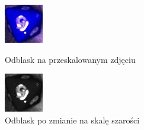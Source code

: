 \begin{figure}[H]
    \centering
    \begin{minipage}[t]{0.45\linewidth}
        \centering
        \includegraphics[width=\linewidth]{chapters/04-czytanie/figures/blask_raw}
        \caption{Odblask na przeskalowanym zdjęciu}
        \label{fig:blaskraw}
    \end{minipage}
    \hfill
    \begin{minipage}[t]{0.45\linewidth}
        \centering
        \includegraphics[width=\linewidth]{chapters/04-czytanie/figures/blask_proc}
        \caption{Odblask po zmianie na skalę szarości}
        \label{fig:blaskproc}
    \end{minipage}
\end{figure}

